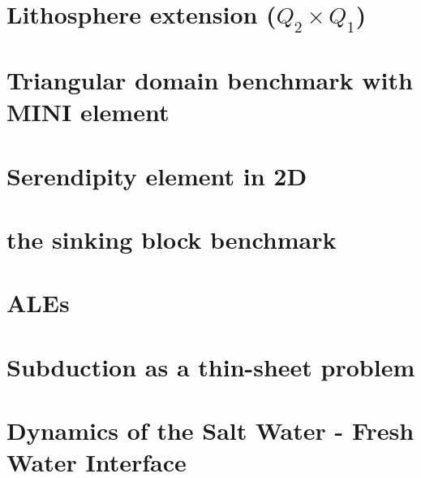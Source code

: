 \documentclass[a4paper,11pt]{report}
\begin{document}
\chapter{Lithosphere extension ($Q_2\times Q_1$)\label{f50}} %

\chapter{Triangular domain benchmark with MINI element\label{f51}} %

\chapter{Serendipity element in 2D \label{f52}} %

\chapter{the sinking block benchmark \label{f53}} %

\chapter{ALEs  \label{f54}} %

\chapter{Subduction as a thin-sheet problem  \label{f55}} %

\chapter{Dynamics of the Salt Water - Fresh Water Interface \label{f56}} %
\end{document}

